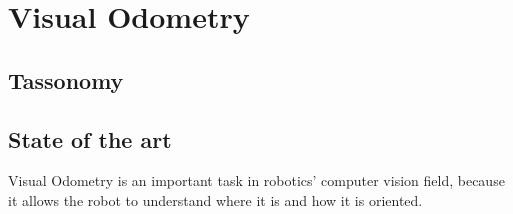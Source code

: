 \section{Visual Odometry}\label{sec:visual-odometry}
\subsection{Tassonomy}\label{subsec:tassonomy}
\subsection{State of the art}\label{subsec:state-of-the-art}
Visual Odometry is an important task in robotics' computer vision field, because it allows the robot to understand where it is and how it is oriented.

